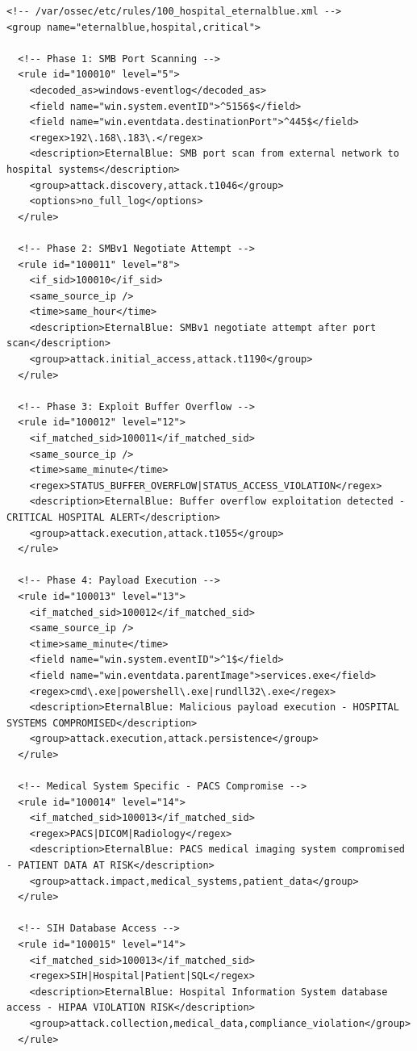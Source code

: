\begin{lstlisting}[style=xmlstyle,caption=Regles EternalBlue specialisees pour environnement hospitalier]
<!-- /var/ossec/etc/rules/100_hospital_eternalblue.xml -->
<group name="eternalblue,hospital,critical">
  
  <!-- Phase 1: SMB Port Scanning -->
  <rule id="100010" level="5">
    <decoded_as>windows-eventlog</decoded_as>
    <field name="win.system.eventID">^5156$</field>
    <field name="win.eventdata.destinationPort">^445$</field>
    <regex>192\.168\.183\.</regex>
    <description>EternalBlue: SMB port scan from external network to hospital systems</description>
    <group>attack.discovery,attack.t1046</group>
    <options>no_full_log</options>
  </rule>

  <!-- Phase 2: SMBv1 Negotiate Attempt -->
  <rule id="100011" level="8">
    <if_sid>100010</if_sid>
    <same_source_ip />
    <time>same_hour</time>
    <description>EternalBlue: SMBv1 negotiate attempt after port scan</description>
    <group>attack.initial_access,attack.t1190</group>
  </rule>

  <!-- Phase 3: Exploit Buffer Overflow -->
  <rule id="100012" level="12">
    <if_matched_sid>100011</if_matched_sid>
    <same_source_ip />
    <time>same_minute</time>
    <regex>STATUS_BUFFER_OVERFLOW|STATUS_ACCESS_VIOLATION</regex>
    <description>EternalBlue: Buffer overflow exploitation detected - CRITICAL HOSPITAL ALERT</description>
    <group>attack.execution,attack.t1055</group>
  </rule>

  <!-- Phase 4: Payload Execution -->
  <rule id="100013" level="13">
    <if_matched_sid>100012</if_matched_sid>
    <same_source_ip />
    <time>same_minute</time>
    <field name="win.system.eventID">^1$</field>
    <field name="win.eventdata.parentImage">services.exe</field>
    <regex>cmd\.exe|powershell\.exe|rundll32\.exe</regex>
    <description>EternalBlue: Malicious payload execution - HOSPITAL SYSTEMS COMPROMISED</description>
    <group>attack.execution,attack.persistence</group>
  </rule>

  <!-- Medical System Specific - PACS Compromise -->
  <rule id="100014" level="14">
    <if_matched_sid>100013</if_matched_sid>
    <regex>PACS|DICOM|Radiology</regex>
    <description>EternalBlue: PACS medical imaging system compromised - PATIENT DATA AT RISK</description>
    <group>attack.impact,medical_systems,patient_data</group>
  </rule>

  <!-- SIH Database Access -->
  <rule id="100015" level="14">
    <if_matched_sid>100013</if_matched_sid>
    <regex>SIH|Hospital|Patient|SQL</regex>
    <description>EternalBlue: Hospital Information System database access - HIPAA VIOLATION RISK</description>
    <group>attack.collection,medical_data,compliance_violation</group>
  </rule>


\end{lstlisting}
